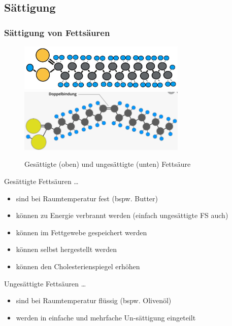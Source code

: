 \documentclass[xcolor=dvipsnames]{beamer}
\begin{document}
    \subsection{Sättigung}
    \begin{frame}[allowframebreaks]
        \frametitle{Sättigung von Fettsäuren}

        \begin{figure}
            \centering
            \includegraphics[width=8cm]{../images/fs_3.jpeg}
            \includegraphics[width=8cm]{../images/fs_4.png}
            \caption{Gesättigte (oben) und ungesättigte (unten) Fettsäure}
        \end{figure}

        \framebreak

        \begin{block}{Gesättigte Fettsäuren \ldots}
            \begin{itemize}
                \setlength\itemsep{1em}
                \item sind bei Raumtemperatur fest (bspw. Butter)
                \item können zu Energie verbrannt werden (einfach ungesättigte FS auch)
                \item können im Fettgewebe gespeichert werden
                \item können selbst hergestellt werden
                \item können den Cholesterienspiegel erhöhen
            \end{itemize}
        \end{block}

        \framebreak

        \begin{block}{Ungesättigte Fettsäuren \ldots}
            \begin{itemize}
                \setlength\itemsep{1em}
                \item sind bei Raumtemperatur flüssig (bspw. Olivenöl)
                \item werden in einfache und mehrfache Un-sättigung eingeteilt
            \end{itemize}
        \end{block}


\end{frame}
\end{document}
